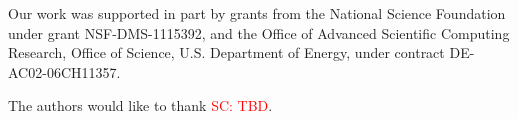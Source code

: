 \documentclass[acmtog, authorversion]{acmart}
\newcommand{\scnote}[1]{{\textcolor{red}{SC: #1}}}
\begin{document}

%
%



\maketitle

 





\begin{acks}
Our work was supported in part by grants from the National Science Foundation under grant NSF-DMS-1115392, and the Office of Advanced Scientific Computing Research, Office of Science, U.S. Department of Energy, under contract DE-AC02-06CH11357.
  
The authors would like to thank \scnote{TBD}.
\end{acks}


\end{document}
